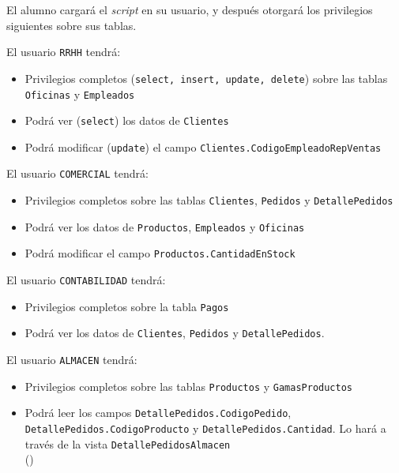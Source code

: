 El alumno cargará el \textit{script} en su usuario, y después otorgará los privilegios siguientes sobre sus tablas.

\begin{homeworkProblem}
  El usuario \texttt{RRHH} tendrá:
  \begin{itemize}
  \item Privilegios completos (\texttt{select, insert, update, delete}) sobre las tablas \texttt{Oficinas} y \texttt{Empleados}
  \item Podrá ver (\texttt{select}) los datos de \texttt{Clientes}
  \item Podrá modificar (\texttt{update}) el campo \texttt{Clientes.CodigoEmpleadoRepVentas}
  \end{itemize}
\end{homeworkProblem}

\begin{homeworkProblem}
  El usuario \texttt{COMERCIAL} tendrá:
  \begin{itemize}
  \item Privilegios completos sobre las tablas \texttt{Clientes}, \texttt{Pedidos} y \texttt{DetallePedidos}
  \item Podrá ver  los datos de \texttt{Productos}, \texttt{Empleados} y \texttt{Oficinas} 
  \item Podrá modificar el campo \texttt{Productos.CantidadEnStock}
  \end{itemize}
\end{homeworkProblem}

\begin{homeworkProblem}
  El usuario \texttt{CONTABILIDAD} tendrá:
  \begin{itemize}
  \item Privilegios completos sobre la tabla \texttt{Pagos}
  \item Podrá ver  los datos de \texttt{Clientes}, \texttt{Pedidos} y \texttt{DetallePedidos}.
  \end{itemize}
\end{homeworkProblem}

\begin{homeworkProblem}
  El usuario \texttt{ALMACEN} tendrá:
  \begin{itemize}
  \item Privilegios completos sobre las tablas \texttt{Productos} y \texttt{GamasProductos}
  \item Podrá leer los campos \texttt{DetallePedidos.CodigoPedido}, \texttt{DetallePedidos.CodigoProducto} y \texttt{DetallePedidos.Cantidad}. Lo hará a través de la vista \texttt{DetallePedidosAlmacen} \\ ()
  \end{itemize}
\end{homeworkProblem}


